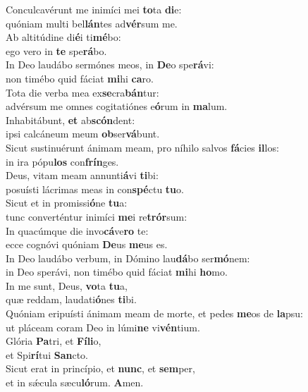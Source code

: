 \evenverse Conculcavérunt me inimíci mei \textbf{to}ta \textbf{di}e:~\*\\
\evenverse quóniam multi bel\textbf{lán}tes ad\textbf{vér}sum me.\\
\oddverse Ab altitúdine di\textbf{é}i ti\textbf{mé}bo:~\*\\
\oddverse ego vero in \textbf{te} spe\textbf{rá}bo.\\
\evenverse In Deo laudábo sermónes meos, in \textbf{De}o spe\textbf{rá}vi:~\*\\
\evenverse non timébo quid fáciat \textbf{mi}hi \textbf{ca}ro.\\
\oddverse Tota die verba mea ex\textbf{se}cra\textbf{bán}tur:~\*\\
\oddverse advérsum me omnes cogitatiónes e\textbf{ó}rum in \textbf{ma}lum.\\
\evenverse Inhabitábunt, \textbf{et} ab\textbf{scón}dent:~\*\\
\evenverse ipsi calcáneum meum \textbf{ob}ser\textbf{vá}bunt.\\
\oddverse Sicut sustinuérunt ánimam meam, pro níhilo salvos \textbf{fá}cies \textbf{il}los:~\*\\
\oddverse in ira pópu\textbf{los} con\textbf{frín}ges.\\
\evenverse Deus, vitam meam annunti\textbf{á}vi \textbf{ti}bi:~\*\\
\evenverse posuísti lácrimas meas in con\textbf{spé}ctu \textbf{tu}o.\\
\oddverse Sicut et in promissi\textbf{ó}ne \textbf{tu}a:~\*\\
\oddverse tunc converténtur inimíci \textbf{me}i re\textbf{trór}sum:\\
\evenverse In quacúmque die invo\textbf{cá}ve\textbf{ro} te:~\*\\
\evenverse ecce cognóvi quóniam \textbf{De}us \textbf{me}us es.\\
\oddverse In Deo laudábo verbum, in Dómino lau\textbf{dá}bo ser\textbf{mó}nem:~\*\\
\oddverse in Deo sperávi, non timébo quid fáciat \textbf{mi}hi \textbf{ho}mo.\\
\evenverse In me sunt, Deus, \textbf{vo}ta \textbf{tu}a,~\*\\
\evenverse quæ reddam, laudati\textbf{ó}nes \textbf{ti}bi.\\
\oddverse Quóniam eripuísti ánimam meam de morte, et pedes \textbf{me}os de \textbf{la}psu:~\*\\
\oddverse ut pláceam coram Deo in lúmi\textbf{ne} vi\textbf{vén}tium.\\
\evenverse Glória \textbf{Pa}tri, et \textbf{Fí}\textbf{li}o,~\*\\
\evenverse et Spi\textbf{rí}tui \textbf{San}cto.\\
\oddverse Sicut erat in princípio, et \textbf{nunc}, et \textbf{sem}per,~\*\\
\oddverse et in sǽcula sæcu\textbf{ló}rum. \textbf{A}men.\\
